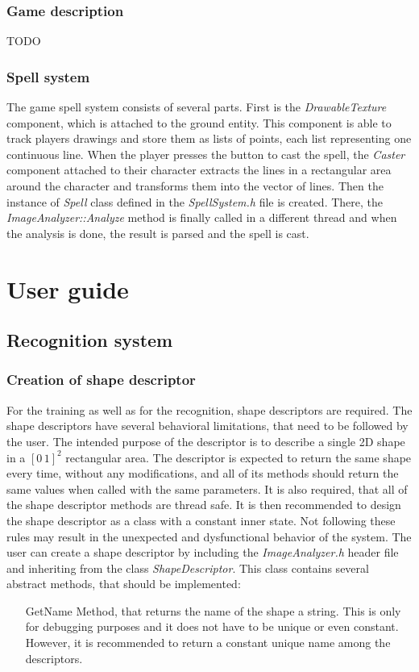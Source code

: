 \begin{description}
\subsection{Game description}
TODO

\subsection{Spell system}
The game spell system consists of several parts. First is the \emph{DrawableTexture} component, which is attached to the ground entity. This component is able to track players drawings and store them as lists of points, each list representing one continuous line. When the player presses the button to cast the spell, the \emph{Caster} component attached to their character extracts the lines in a rectangular area around the character and transforms them into the vector of lines. Then the instance of \emph{Spell} class defined in the \emph{SpellSystem.h} file is created. There, the \emph{ImageAnalyzer::Analyze} method is finally called in a different thread and when the analysis is done, the result is parsed and the spell is cast.

\chapter{User guide}
\section{Recognition system}
\subsection{Creation of shape descriptor}
For the training as well as for the recognition, shape descriptors are required. The shape descriptors have several behavioral limitations, that need to be followed by the user. The intended purpose of the descriptor is to describe a single 2D shape in a $[0\,1]^2$ rectangular area. The descriptor is expected to return the same shape every time, without any modifications, and all of its methods should return the same values when called with the same parameters. It is also required, that all of the shape descriptor methods are thread safe. It is then recommended to design the shape descriptor as a class with a constant inner state. Not following these rules may result in the unexpected and dysfunctional behavior of the system. The user can create a shape descriptor by including the \emph{ImageAnalyzer.h} header file and inheriting from the class \emph{ShapeDescriptor}. This class contains several abstract methods, that should be implemented:
\begin{enumerate}
\item [GetName] Method, that returns the name of the shape a string. This is only for debugging purposes and it does not have to be unique or even constant. However, it is recommended to return a constant unique name among the descriptors.


\end{enumerate}
\end{description}
